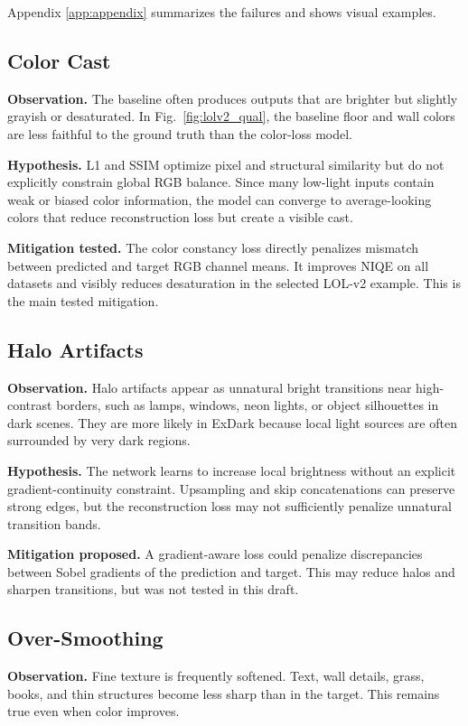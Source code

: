 \documentclass[10pt,twocolumn]{article}
\begin{document}
Appendix \ref{app:appendix} summarizes the failures and shows visual examples.

\subsection{Color Cast}
\textbf{Observation.} The baseline often produces outputs that are brighter but slightly grayish or desaturated. In Fig.~\ref{fig:lolv2_qual}, the baseline floor and wall colors are less faithful to the ground truth than the color-loss model.

\textbf{Hypothesis.} L1 and SSIM optimize pixel and structural similarity but do not explicitly constrain global RGB balance. Since many low-light inputs contain weak or biased color information, the model can converge to average-looking colors that reduce reconstruction loss but create a visible cast.

\textbf{Mitigation tested.} The color constancy loss directly penalizes mismatch between predicted and target RGB channel means. It improves NIQE on all datasets and visibly reduces desaturation in the selected LOL-v2 example. This is the main tested mitigation.

\subsection{Halo Artifacts}
\textbf{Observation.} Halo artifacts appear as unnatural bright transitions near high-contrast borders, such as lamps, windows, neon lights, or object silhouettes in dark scenes. They are more likely in ExDark because local light sources are often surrounded by very dark regions.

\textbf{Hypothesis.} The network learns to increase local brightness without an explicit gradient-continuity constraint. Upsampling and skip concatenations can preserve strong edges, but the reconstruction loss may not sufficiently penalize unnatural transition bands.

\textbf{Mitigation proposed.} A gradient-aware loss could penalize discrepancies between Sobel gradients of the prediction and target. This may reduce halos and sharpen transitions, but was not tested in this draft.

\subsection{Over-Smoothing}
\textbf{Observation.} Fine texture is frequently softened. Text, wall details, grass, books, and thin structures become less sharp than in the target. This remains true even when color improves.
\end{document}
